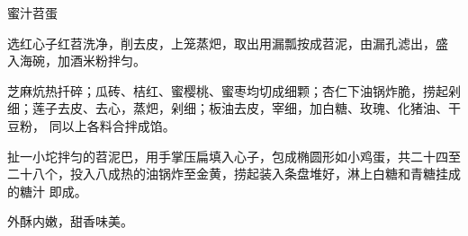 \begin{recipe}[八宝苕蛋]{蜜汁苕蛋}

\ingredients


\preparation

\step 选红心子红苕洗净，削去皮，上笼蒸𤆵，取出用漏瓢按成苕泥，由漏孔滤出，盛
入海碗，加酒米粉拌匀。

\step 芝麻炕热扦碎；瓜砖、桔红、蜜樱桃、蜜枣均切成细颗；杏仁下油锅炸脆，捞起剁
细；莲子去皮、去心，蒸𤆵，剁细；板油去皮，宰细，加白糖、玫瑰、化猪油、干豆粉，
同以上各料合拌成馅。

\step 扯一小坨拌匀的苕泥巴，用手掌压扁填入心子，包成椭圆形如小鸡蛋，共二十四至
二十八个，投入八成热的油锅炸至金黄，捞起装入条盘堆好，淋上白糖和青糖挂成的糖汁
即成。

\features

外酥内嫩，甜香味美。

\end{recipe}

